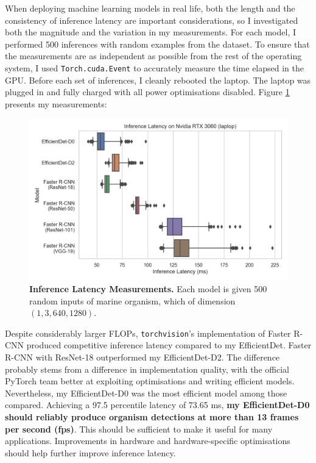 \documentclass[12pt,a4paper,twoside,openany]{report}
\begin{document}
\vspace{5mm}


When deploying machine learning models in real life, both the length and the consistency of inference latency are important considerations, so I investigated both the magnitude and the variation in my measurements. For each model, I performed 500 inferences with random examples from the dataset. To ensure that the measurements are as independent as possible from the rest of the operating system, I used \verb|Torch.cuda.Event| to accurately measure the time elapsed in the GPU. Before each set of inferences, I cleanly rebooted the laptop. The laptop was plugged in and fully charged with all power optimisations disabled. Figure \ref{fig:inference_latency} presents my measurements:

\begin{figure}[H]
    \centering
    \includegraphics[width=\textwidth]{figs/eval/efficiency/inference_latency.png}
    \caption{\textbf{Inference Latency Measurements.} Each model is given 500 random inputs of marine organism, which of dimension $(1, 3, 640, 1280).$}
    \label{fig:inference_latency}
\end{figure}

Despite considerably larger FLOPs, \verb|torchvision|'s implementation of Faster R-CNN produced competitive inference latency compared to my EfficientDet. Faster R-CNN with ResNet-18 \cite{he_deep_2015} outperformed my EfficientDet-D2. The difference probably stems from a difference in implementation quality, with the official PyTorch team better at exploiting optimisations and writing efficient models. Nevertheless, my EfficientDet-D0 was the most efficient model among those compared. Achieving a 97.5 percentile latency of 73.65 ms, \textbf{ my EfficientDet-D0 should reliably produce organism detections at more than 13 frames per second (fps)}. This should be sufficient to make it useful for many applications. Improvements in hardware and hardware-specific optimisations should help further improve inference latency.  
\end{document}
